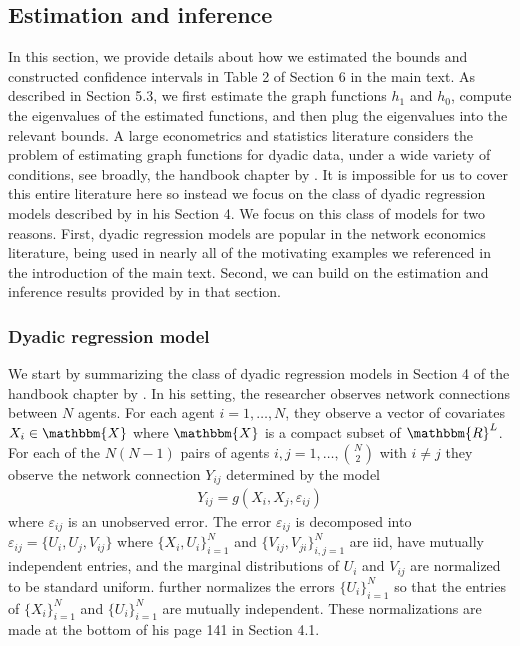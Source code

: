 \documentclass[12pt]{article}
\theoremstyle{definition}
\begin{document}
\subsection{Estimation and inference}
In this section, we provide details about how we estimated the bounds and constructed confidence intervals in Table 2 of Section 6 in the main text. As described in Section 5.3, we first estimate the graph functions $h_1$ and $h_0$, compute the eigenvalues of the estimated functions, and then plug the eigenvalues into the relevant bounds. A large econometrics and statistics literature considers the problem of estimating graph functions for dyadic data, under a wide variety of conditions, see broadly, the handbook chapter by \cite{graham2020network}.  It is impossible for us to cover this entire literature here so instead we focus on the class of dyadic regression models described by \cite{graham2020network} in his Section 4. We focus on this class of models for two reasons. First, dyadic regression models are popular in the network economics literature, being used in nearly all of the motivating examples we referenced in the introduction of the main text. Second, we can build on the estimation and inference results provided by \cite{graham2020network} in that section.   

\subsubsection{Dyadic regression model}
We start by summarizing the class of dyadic regression models in Section 4 of the handbook chapter by \cite{graham2020network}. In his setting, the researcher observes network connections between $N$ agents. For each agent $i = 1,\ldots, N$, they observe a vector of covariates $X_i \in \mathbbm{X}$ where $\mathbbm{X}$ is a compact subset of $\mathbbm{R}^{L}$. For each of the $N(N-1)$ pairs of agents $i,j = 1,\ldots, {N\choose 2}$ with $i \neq j$ they observe the network connection $Y_{ij}$ determined by the model  
\begin{align*}
Y_{ij} = g\left(X_i,X_j,\varepsilon_{ij}\right)
\end{align*}
where $\varepsilon_{ij}$ is an unobserved error. The error $\varepsilon_{ij}$ is decomposed into $\varepsilon_{ij} = \{U_i,U_j,V_{ij}\}$ where $\{X_i,U_{i}\}_{i=1}^{N}$ and $\{V_{ij},V_{ji}\}_{i,j=1}^{N}$ are iid, have mutually independent entries, and the marginal distributions of $U_i$ and $V_{ij}$ are normalized to be standard uniform. \cite{graham2020network} further normalizes the errors $\{U_{i}\}_{i=1}^{N}$ so that the entries of  $\{X_i\}_{i=1}^{N}$ and $\{U_{i}\}_{i=1}^{N}$ are mutually independent. These normalizations are made at the bottom of his page 141 in Section 4.1.  
\end{document}
